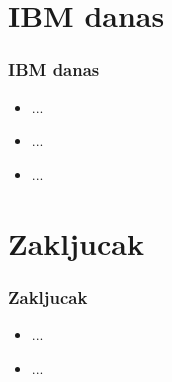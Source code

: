 \documentclass{beamer}
\begin{document}
\section{IBM danas}

\begin{frame}[fragile]\frametitle{IBM danas}
	\begin{itemize}	
		\item ...
		\item ...
		\item ...
	\end{itemize}
\end{frame}

\section{Zakljucak}

\begin{frame}[fragile]\frametitle{Zakljucak}
	\begin{itemize}	
		\item ...
		\item ...
	\end{itemize}
\end{frame}
\end{document}
